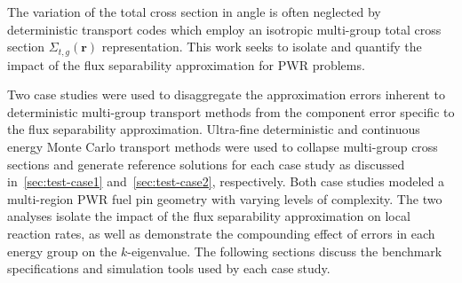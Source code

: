 

The variation of the total cross section in angle is often neglected by deterministic transport codes which employ an isotropic multi-group total cross section $\Sigma_{t,g}(\mathbf{r})$ representation.  This work seeks to isolate and quantify the impact of the flux separability approximation for PWR problems.

Two case studies were used to disaggregate the approximation errors inherent to deterministic multi-group transport methods from the component error specific to the flux separability approximation. Ultra-fine deterministic and continuous energy Monte Carlo transport methods were used to collapse multi-group cross sections and generate reference solutions for each case study as discussed in~\autoref{sec:test-case1} and~\autoref{sec:test-case2}, respectively. Both case studies modeled a multi-region PWR fuel pin geometry with varying levels of complexity. The two analyses isolate the impact of the flux separability approximation on local reaction rates, as well as demonstrate the compounding effect of errors in each energy group on the $k$-eigenvalue. The following sections discuss the benchmark specifications and simulation tools used by each case study.
